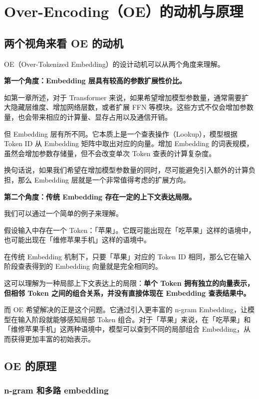 \documentclass[11pt]{article}
\begin{document}
\section{Over-Encoding（OE）的动机与原理}

\subsection{两个视角来看 OE 的动机}

OE（Over-Tokenized Embedding）的设计动机可以从两个角度来理解。

\textbf{第一个角度：Embedding 层具有较高的参数扩展性价比。}

如第一章所述，对于 Transformer 来说，如果希望增加模型参数量，通常需要扩大隐藏层维度、增加网络层数，或者扩展 FFN 等模块。这些方式不仅会增加参数量，也会带来相应的计算量、显存占用以及通信开销。

但 Embedding 层有所不同。它本质上是一个查表操作（Lookup），模型根据 Token ID 从 Embedding 矩阵中取出对应的向量。增加 Embedding 的词表规模，虽然会增加参数存储量，但不会改变单次 Token 查表的计算复杂度。

换句话说，如果我们希望在增加模型参数量的同时，尽可能避免引入额外的计算负担，那么 Embedding 层就是一个非常值得考虑的扩展方向。

\textbf{第二个角度：传统 Embedding 存在一定的上下文表达局限。}

我们可以通过一个简单的例子来理解。

假设输入中存在一个 Token：「苹果」。它既可能出现在「吃苹果」这样的语境中，也可能出现在「维修苹果手机」这样的语境中。

在传统 Embedding 机制下，只要「苹果」对应的 Token ID 相同，那么它在输入阶段查表得到的 Embedding 向量就是完全相同的。

这可以理解为一种局部上下文表达上的局限：\textbf{单个 Token 拥有独立的向量表示，但相邻 Token 之间的组合关系，并没有直接体现在 Embedding 查表结果中。}

而 OE 希望解决的正是这个问题。它通过引入更丰富的 n-gram Embedding，让模型在输入阶段就能够感知局部 Token 组合。对于「苹果」来说，在「吃苹果」和「维修苹果手机」这两种语境中，模型可以查到不同的局部组合 Embedding，从而获得更加丰富的初始表示。

\subsection{OE 的原理}

\subsubsection{n-gram 和多路 embedding}
\end{document}
